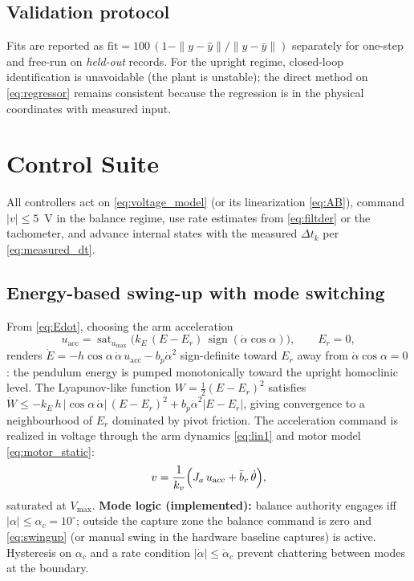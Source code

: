 \documentclass[conference]{IEEEtran}
\newcommand{\sat}{\operatorname{sat}}
\newcommand{\sign}{\operatorname{sign}}
\begin{document}
\subsection{Validation protocol}
Fits are reported as $\mathrm{fit} = 100\,(1 - \|y-\hat y\|/\|y-\bar y\|)$ separately for one-step and free-run on \emph{held-out} records. For the upright regime, closed-loop identification is unavoidable (the plant is unstable); the direct method on \eqref{eq:regressor} remains consistent because the regression is in the physical coordinates with measured input.

\section{Control Suite}\label{sec:control}
All controllers act on \eqref{eq:voltage_model} (or its linearization \eqref{eq:AB}), command $|v|\le 5$~V in the balance regime, use rate estimates from \eqref{eq:filtder} or the tachometer, and advance internal states with the measured $\Delta t_k$ per \eqref{eq:measured_dt}.

\subsection{Energy-based swing-up with mode switching}\label{sec:swing}
From \eqref{eq:Edot}, choosing the arm acceleration
\begin{equation}
u_{\mathrm{acc}} = \sat_{a_{\max}}\!\bigl(k_E\,(E - E_r)\,\sign(\dot\alpha\cos\alpha)\bigr),\qquad E_r = 0,
\label{eq:swingup}
\end{equation}
renders $\dot E = -h\cos\alpha\,\dot\alpha\,u_{\mathrm{acc}} - b_p\dot\alpha^2$ sign-definite toward $E_r$ away from $\dot\alpha\cos\alpha=0$: the pendulum energy is pumped monotonically toward the upright homoclinic level. The Lyapunov-like function $W = \tfrac12(E-E_r)^2$ satisfies $\dot W \le -k_E\,h\,|\cos\alpha\,\dot\alpha|\,(E-E_r)^2 + b_p\dot\alpha^2|E-E_r|$, giving convergence to a neighbourhood of $E_r$ dominated by pivot friction. The acceleration command is realized in voltage through the arm dynamics \eqref{eq:lin1} and motor model \eqref{eq:motor_static}:
\begin{equation}
v = \frac{1}{k_v}\Bigl(J_a\,u_{\mathrm{acc}} + \bar b_r\,\dot\theta\Bigr),
\end{equation}
saturated at $V_{\max}$. \textbf{Mode logic (implemented):} balance authority engages iff $|\alpha| \le \alpha_c = 10^\circ$; outside the capture zone the balance command is zero and \eqref{eq:swingup} (or manual swing in the hardware baseline captures) is active. Hysteresis on $\alpha_c$ and a rate condition $|\dot\alpha|\le\dot\alpha_c$ prevent chattering between modes at the boundary.
\end{document}
